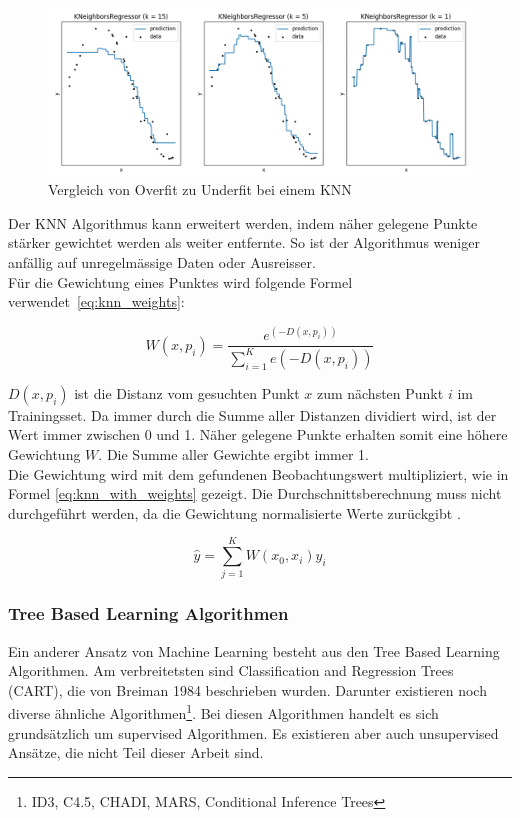 \begin{figure}[ht]
\centering
\includegraphics[width=\textwidth]{images/knears_overfit.png}
\caption[Vergleich von Overfit zu Underfit bei einem KNN]{Vergleich von Overfit zu Underfit bei einem KNN}
\label{fig:under_overfit_knn}
\end{figure}

Der KNN Algorithmus kann erweitert werden, indem näher gelegene Punkte stärker gewichtet werden als weiter entfernte. So ist der Algorithmus weniger anfällig auf unregelmässige Daten oder Ausreisser.\\
Für die Gewichtung eines Punktes wird folgende Formel verwendet~\eqref{eq:knn_weights}:

\begin{equation}
\label{eq:knn_weights}
W(x, p_i) = \frac{e^{(-D(x, p_i))}}{\sum_{i=1}^{K} e(-D(x, p_i))}
\end{equation}

$D(x, p_i)$ ist die Distanz vom gesuchten Punkt $x$ zum nächsten Punkt $i$ im Trainingsset. Da immer durch die Summe aller Distanzen dividiert wird, ist der Wert immer zwischen 0 und 1. Näher gelegene Punkte erhalten somit eine höhere Gewichtung $W$. Die Summe aller Gewichte ergibt immer 1.\\
Die Gewichtung wird mit dem gefundenen Beobachtungswert multipliziert, wie in Formel \eqref{eq:knn_with_weights} gezeigt. Die Durchschnittsberechnung muss nicht durchgeführt werden, da die Gewichtung normalisierte Werte zurückgibt \cite{knn_2, knn_3}.

\begin{equation}
\label{eq:knn_with_weights}
\hat{y} = \sum_{j=1}^{K} W(x_0, x_i) y_i
\end{equation}

\subsubsection{Tree Based Learning Algorithmen}
Ein anderer Ansatz von Machine Learning besteht aus den Tree Based Learning Algorithmen. Am verbreitetsten sind Classification and Regression Trees (CART), die von Breiman 1984 beschrieben wurden. Darunter existieren noch diverse ähnliche Algorithmen\footnote{ID3, C4.5, CHADI, MARS, Conditional Inference Trees}. Bei diesen Algorithmen handelt es sich grundsätzlich um supervised Algorithmen. Es existieren aber auch unsupervised Ansätze, die nicht Teil dieser Arbeit sind.

